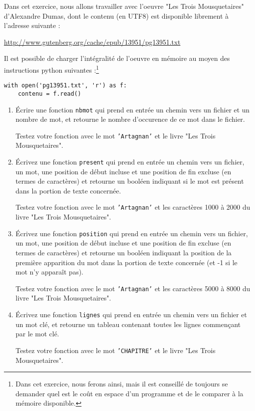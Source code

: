 \documentclass[10pt,a4paper]{sujets-exercices}
\begin{document}

Dans cet exercice, nous allons travailler avec l'oeuvre "Les Trois Mousquetaires" d'Alexandre Dumas, dont le contenu (en UTF8) est disponible librement à l'adresse suivante :
\begin{center}
	\url{http://www.gutenberg.org/cache/epub/13951/pg13951.txt}
\end{center}

Il est possible de charger l'intégralité de l'oeuvre en mémoire au moyen des instructions python suivantes :\footnote{Dans cet exercice, nous ferons ainsi, mais il est conseillé de toujours se demander quel est le coût en espace d'un programme et de le comparer à la mémoire disponible.} 
\begin{verbatim}
with open('pg13951.txt', 'r') as f:
    contenu = f.read()
\end{verbatim}
\begin{enumerate}
\item Écrire une fonction \verb!nbmot! qui prend en entrée un chemin vers un fichier et un nombre de mot, et retourne le nombre d'occurence de ce mot dans le fichier.

Testez votre fonction avec le mot \texttt{'Artagnan'} et le livre "Les Trois Mousquetaires".

\item Écrivez une fonction \verb!present! qui prend en entrée un chemin vers un fichier, un mot, une position de début incluse et une position de fin excluse (en termes de caractères) et retourne un booléen indiquant si le mot est présent dans la portion de texte concernée.

Testez votre fonction avec le mot \texttt{'Artagnan'} et les caractères 1000 à 2000 du livre "Les Trois Mousquetaires".

\item Écrivez une fonction \verb!position! qui prend en entrée un chemin vers un fichier, un mot, une position de début incluse et une position de fin excluse (en termes de caractères) et retourne un booléen indiquant la position de la première apparition du mot dans la portion de texte concernée (et -1 si le mot n'y apparaît pas).

Testez votre fonction avec le mot \texttt{'Artagnan'} et les caractères 5000 à 8000 du livre "Les Trois Mousquetaires".

\item Écrivez une fonction \verb!lignes! qui prend en entrée un chemin vers un fichier et un mot clé, et retourne un tableau contenant toutes les lignes commençant par le mot clé.

Testez votre fonction avec le mot \texttt{'CHAPITRE'} et le livre "Les Trois Mousquetaires".
\end{enumerate}
\end{document}
